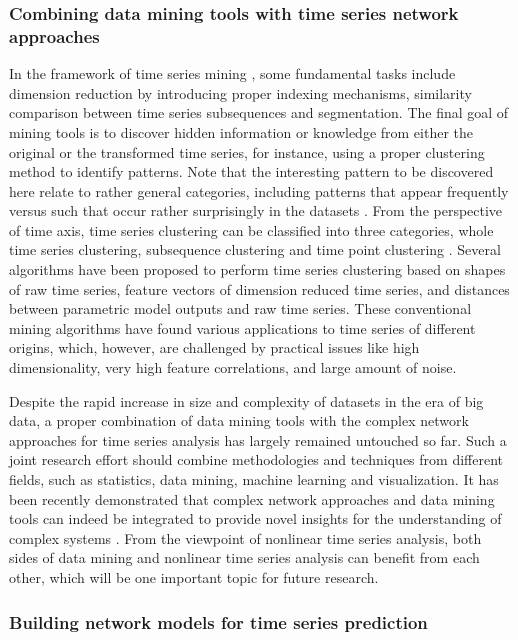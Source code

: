 \subsubsection{Combining data mining tools with time series network approaches}
In the framework of time series mining \cite{FU2011}, some fundamental tasks include dimension reduction by introducing proper indexing mechanisms, similarity comparison between time series subsequences and segmentation. The final goal of mining tools is to discover hidden information or knowledge from either the original or the transformed time series, for instance, using a proper clustering method to identify patterns. Note that the interesting pattern to be discovered here relate to rather general categories, including patterns that appear frequently versus such that occur rather surprisingly in the datasets \cite{FU2011,Aghabozorgi2015}. From the perspective of time axis, time series clustering can be classified into three categories, whole time series clustering, subsequence clustering and time point clustering \cite{Aghabozorgi2015}. Several algorithms have been proposed to perform time series clustering based on shapes of raw time series, feature vectors of dimension reduced time series, and distances between parametric model outputs and raw time series. These conventional mining algorithms have found various applications to time series of different origins, which, however, are challenged by practical issues like high dimensionality, very high feature correlations, and large amount of noise.

Despite the rapid increase in size and complexity of datasets in the era of big data, a proper combination of data mining tools with the complex network approaches for time series analysis has largely remained untouched so far. Such a joint research effort should combine methodologies and techniques from different fields, such as statistics, data mining, machine learning and visualization. It has been recently demonstrated that complex network approaches and data mining tools can indeed be integrated to provide novel insights for the understanding of complex systems \cite{Zanin2016}. From the viewpoint of nonlinear time series analysis, both sides of data mining and nonlinear time series analysis can benefit from each other, which will be one important topic for future research.

\subsubsection{Building network models for time series prediction}

